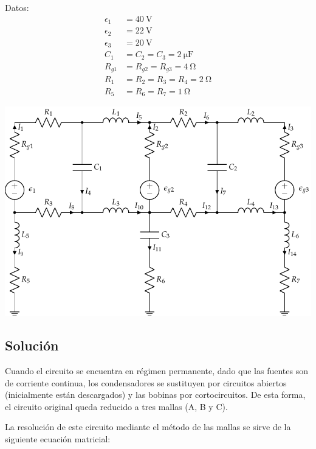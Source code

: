 \documentclass[10pt]{article}
\begin{document}
\begin{minipage}[c]{0.2\linewidth}
  Datos:
  \begin{align*}
    \epsilon_{1}&=\SI{40}{\volt}\\
    \epsilon_{2}&=\SI{22}{\volt}\\
    \epsilon_{3}&=\SI{20}{\volt}\\
    C_{1}&=C_{2}=C_{3}=\SI{2}{\micro\farad}\\
    R_{g1}&=R_{g2}=R_{g3}=\SI{4}{\ohm}\\
    R_{1}&=R_{2}=R_{3}=R_{4}=\SI{2}{\ohm}\\
    R_{5}&=R_{6}=R_{7}=\SI{1}{\ohm}
  \end{align*}
\end{minipage}
\begin{minipage}[c]{0.8\linewidth}
  \includegraphics[scale = 0.8]{../figs/mallas_condensadores_bobinas.pdf}
\end{minipage}

\subsection*{Solución}

Cuando el circuito se encuentra en régimen permanente, dado que las
fuentes son de corriente continua, los condensadores se sustituyen
por circuitos abiertos (inicialmente están descargados) y las bobinas
por cortocircuitos. De esta forma, el circuito original queda reducido
a tres mallas (A, B y C).

La resolución de este circuito mediante el método de las mallas se
sirve de la siguiente ecuación matricial:
\end{document}
